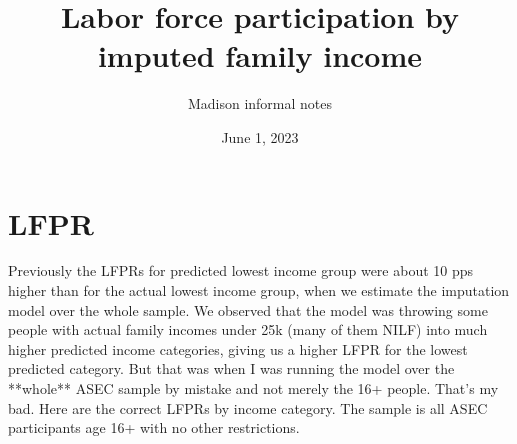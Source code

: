 \documentclass{article}
\title{Labor force participation by imputed family income}
\author{Madison informal notes}
\date{June 1, 2023}
\begin{document}
	\maketitle
	

\section{LFPR}
 Previously the LFPRs for predicted lowest income group were about 10 pps higher than for the actual lowest income group, when we estimate the imputation model over the whole sample. We observed that the model was throwing some people with actual family incomes under 25k (many of them NILF) into much higher predicted income categories, giving us a higher LFPR for the lowest predicted category. But that was when I was running the model over the **whole** ASEC sample by mistake and not merely the 16+ people. That's my bad. Here are the correct LFPRs by income category. The sample is all ASEC participants age 16+ with no other restrictions.
\end{document}
